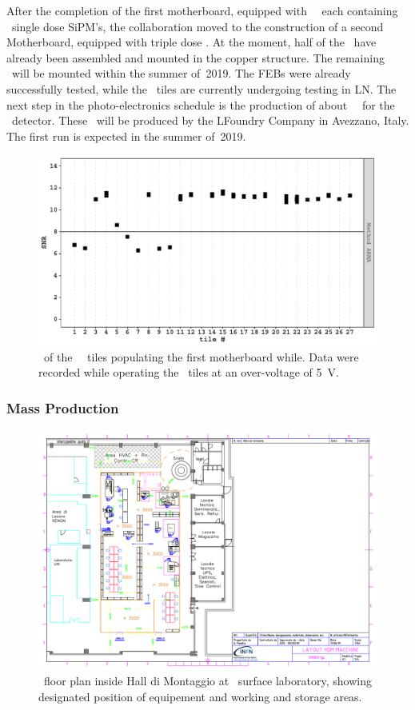 After the completion of the first motherboard, equipped with \DSkSQBPdmsNumber\ \DSkPdms\ each containing  \DSkTileSiPMsCustomNumber\ single dose SiPM's, the collaboration moved to the construction of a second Motherboard, equipped with triple dose \SiPMs.   At the moment, half of the \DSkPdms\ have already been assembled and mounted in the copper structure. The remaining \DSkPdms\ will be mounted within the summer of~2019.  The FEBs were already successfully tested, while the \SiPM\ tiles are currently undergoing testing in LN. The next step in the photo-electronics schedule is the production of about  \DSkPdmsSecondBatchNumber\ \DSkPdms\ for the \DSps\ detector. These \SiPMs\ will be produced by the LFoundry Company in Avezzano, Italy.  The first run is expected in the summer of~2019. 

\begin{figure}[t!]
\includegraphics[width=0.5\columnwidth]{./Figures/SNR2.PDF}
\caption[\SNR\ of the \SiPMs\ tiles of the first motherboard]{\SNR\ of the \DSkSQBPdmsNumber\ \SiPM\ tiles populating the first motherboard while.  Data were recorded while operating the \SiPM\ tiles at an over-voltage of \SI{5}{\volt}.}
\label{fig:SNR2} 
\end{figure} 


\subsubsection{Mass Production}

\begin{figure}[t!]
\includegraphics[width=1.1\textwidth, angle=270]{./Figures/NOA_layout.pdf}
\caption[\NOA\ floor plan]{\NOA\ floor plan inside Hall di Montaggio at \LNGS\ surface laboratory, showing designated position of equipement and working and storage areas.}
\label{fig:NOA_layout}
\end{figure}

